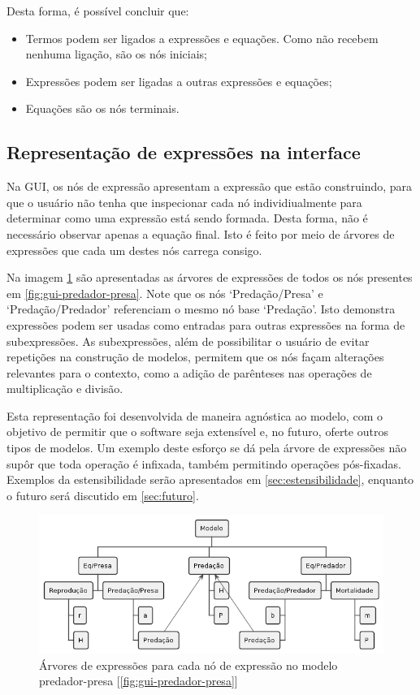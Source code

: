 \documentclass[
	12pt,				%
	openright,			%
	oneside,			%
	a4paper,			%
	main=brazil,
	english,			%
	]{ufsj-abntex2}
\begin{document}
Desta forma, é possível concluir que:

\begin{itemize}
    \item Termos podem ser ligados a expressões e equações. Como não recebem nenhuma ligação, são os nós iniciais;
    \item Expressões podem ser ligadas a outras expressões e equações;
    \item Equações são os nós terminais.
\end{itemize}

\subsection{Representação de expressões na interface}
\label{subsec:exprtree}

Na GUI, os nós de expressão apresentam a expressão que estão construindo, para que o usuário não tenha que inspecionar cada nó individiualmente para determinar como uma expressão está sendo formada. Desta forma, não é necessário observar apenas a equação final. Isto é feito por meio de árvores de expressões que cada um destes nós carrega consigo.

Na imagem \ref{fig:expr-tree} são apresentadas as árvores de expressões de todos os nós presentes em \ref{fig:gui-predador-presa}. Note que os nós `Predação/Presa' e `Predação/Predador' referenciam o mesmo nó base `Predação'. Isto demonstra expressões podem ser usadas como entradas para outras expressões na forma de subexpressões. As subexpressões, além de possibilitar o usuário de evitar repetições na construção de modelos, permitem que os nós façam alterações relevantes para o contexto, como a adição de parênteses nas operações de multiplicação e divisão.

Esta representação foi desenvolvida de maneira agnóstica ao modelo, com o objetivo de permitir que o software seja extensível e, no futuro, oferte outros tipos de modelos. Um exemplo deste esforço se dá pela árvore de expressões não supôr que toda operação é infixada, também permitindo operações pós-fixadas. Exemplos da estensibilidade serão apresentados em \ref{sec:estensibilidade}, enquanto o futuro será discutido em \ref{sec:futuro}.

\begin{figure}[h]
    \centering
    \includegraphics[scale=0.63]{diagrams/img/expr-tree.png} 
    \caption{Árvores de expressões para cada nó de expressão no modelo predador-presa [\ref{fig:gui-predador-presa}]}
    \label{fig:expr-tree}
\end{figure}
\end{document}
